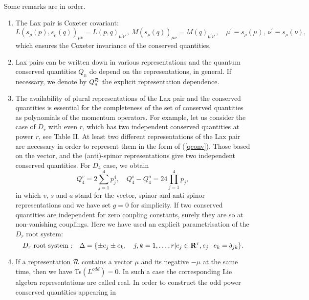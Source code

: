 \documentclass[a4paper,12pt]{article}
\begin{document}
\bigskip
Some remarks are in order.
\begin{enumerate}
\item
The Lax pair is Coxeter covariant:
\begin{equation}
   L\left(s_{\rho}(p),s_{\rho}(q)\right)_{\mu\nu}=
   L\left(p,q\right)_{\mu^\prime\nu^\prime},\
   M\left(s_{\rho}(q)\right)_{\mu\nu}=
   M(q)_{\mu^\prime\nu^\prime},\quad \mu^\prime\equiv s_{\rho}(\mu),
   \  \nu^\prime\equiv s_{\rho}(\nu),
\end{equation}
which ensures the Coxeter invariance of the conserved quantities.
\item
Lax pairs can be written down in various representations and the
quantum conserved quantities \(Q_n\) do depend on the representations,
in general.
If necessary, we denote by \(Q_n^{\cal R}\)
the explicit representation dependence.
\item
The availability of plural representations of the Lax pair and the conserved
quantities is essential
for the completeness of the set of conserved quantities as polynomials of
the momentum operators.
For example, let us consider the case of \(D_r\) with even \(r\),
which has two
independent conserved quantities at power \(r\), see Table II.
At least two different representations of the Lax pair are necessary in
order to represent them in the form of (\ref{qconv}).
Those based on the vector, and the (anti)-spinor representations
give two independent conserved quantities. For  \(D_4\)
case, we obtain
\begin{equation}
   Q_4^v=2\sum_{j=1}^4p_j^4,\quad Q_4^s-Q_4^a=24\prod_{j=1}^4p_j,
\end{equation}
in which \(v\), \(s\) and \(a\) stand for the vector, spinor and anti-spinor
representations and we have set \(g=0\) for simplicity.
If two conserved quantities are independent for zero coupling constants,
surely they are so at non-vanishing couplings. Here we have used an explicit
parametrisation of the \(D_r\) root system:
\begin{equation}
   D_r\ \mbox{root system :}\quad \Delta
   =\{\pm e_j\pm e_k,\quad j,k=1,\ldots,r|
   e_j\in{\bf R}^r, e_j\cdot e_k=\delta_{jk}\}.
   \label{drroots}
\end{equation}
\item
If a representation \({\cal R}\) contains  a vector \(\mu\) and
its negative \(-\mu\) at the same time, then we have Ts\((L^{odd})=0\).
In such a case the corresponding Lie algebra
representations are called real.
In order to construct the odd power conserved quantities appearing in

\end{enumerate}
\end{document}
